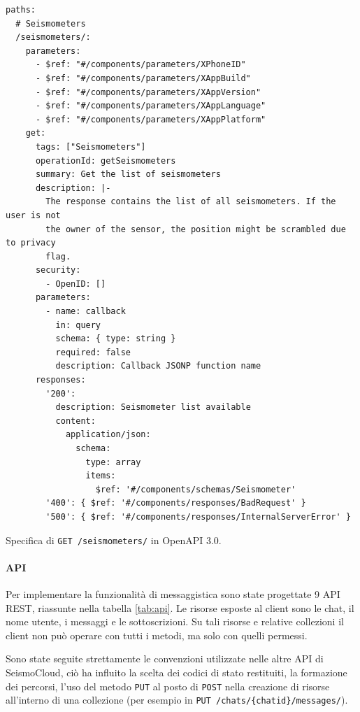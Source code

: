 \begin{longlisting}
\begin{verbatim}
paths:
  # Seismometers
  /seismometers/:
    parameters:
      - $ref: "#/components/parameters/XPhoneID"
      - $ref: "#/components/parameters/XAppBuild"
      - $ref: "#/components/parameters/XAppVersion"
      - $ref: "#/components/parameters/XAppLanguage"
      - $ref: "#/components/parameters/XAppPlatform"
    get:
      tags: ["Seismometers"]
      operationId: getSeismometers
      summary: Get the list of seismometers
      description: |-
        The response contains the list of all seismometers. If the user is not
        the owner of the sensor, the position might be scrambled due to privacy
        flag.
      security:
        - OpenID: []
      parameters:
        - name: callback
          in: query
          schema: { type: string }
          required: false
          description: Callback JSONP function name
      responses:
        '200':
          description: Seismometer list available
          content:
            application/json:
              schema:
                type: array
                items:
                  $ref: '#/components/schemas/Seismometer'
        '400': { $ref: '#/components/responses/BadRequest' }
        '500': { $ref: '#/components/responses/InternalServerError' }
\end{verbatim}
\caption{Specifica di \texttt{GET /seismometers/} in OpenAPI 3.0.}
\label{listing:openapi}
\end{longlisting}

\paragraph{API} Per implementare la funzionalità di messaggistica sono state progettate 9 API REST, riassunte nella tabella \ref{tab:api}. Le risorse esposte al client sono le chat, il nome utente, i messaggi e le sottoscrizioni. Su tali risorse e relative collezioni il client non può operare con tutti i metodi, ma solo con quelli permessi.

Sono state seguite strettamente le convenzioni utilizzate nelle altre API di SeismoCloud, ciò ha influito la scelta dei codici di stato restituiti, la formazione dei percorsi, l'uso del metodo \texttt{PUT} al posto di \texttt{POST} nella creazione di risorse all'interno di una collezione (per esempio in \texttt{PUT /chats/\{chatid\}/messages/}).

